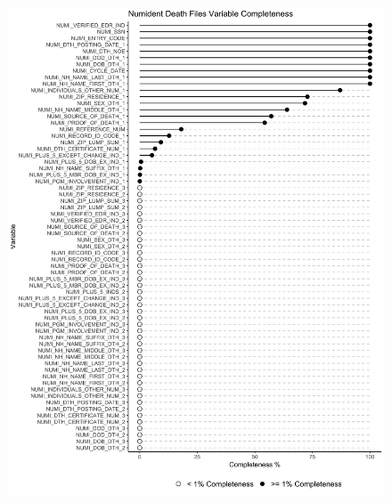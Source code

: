 \documentclass[
  11pt,
]{article}
\begin{document}
\begin{figure}
  \centering
  \includegraphics[width = 6.9in]{../illustrations/death_coverage.png}
  \caption{}
\end{figure}
\end{document}
